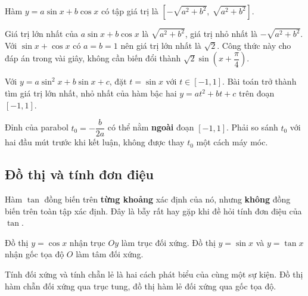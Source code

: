 \documentclass[11pt, a4paper]{article}
\begin{document}
\begin{dinhly}
Hàm $y = a\sin x + b\cos x$ có tập giá trị là $\left[-\sqrt{a^2 + b^2},\ \sqrt{a^2 + b^2}\right]$.

 Giá trị lớn nhất của $a\sin x + b\cos x$ là $\sqrt{a^2 + b^2}$, giá trị nhỏ nhất là $-\sqrt{a^2 + b^2}$. Với $\sin x + \cos x$ có $a = b = 1$ nên giá trị lớn nhất là $\sqrt{2}$. Công thức này cho đáp án trong vài giây, không cần biến đổi thành $\sqrt{2}\sin\left(x + \dfrac{\pi}{4}\right)$.
\end{dinhly}
\begin{dinhly}
Với $y = a\sin^2 x + b\sin x + c$, đặt $t = \sin x$ với $t \in [-1, 1]$. Bài toán trở thành tìm giá trị lớn nhất, nhỏ nhất của hàm bậc hai $y = at^2 + bt + c$ trên đoạn $[-1, 1]$.

 Đỉnh của parabol $t_0 = -\dfrac{b}{2a}$ có thể nằm \textbf{ngoài} đoạn $[-1, 1]$. Phải so sánh $t_0$ với hai đầu mút trước khi kết luận, không được thay $t_0$ một cách máy móc.
\end{dinhly}
\subsection{Đồ thị và tính đơn điệu}

\begin{dinhly}

 Hàm $\tan$ đồng biến trên \textbf{từng khoảng} xác định của nó, nhưng \textbf{không} đồng biến trên toàn tập xác định. Đây là bẫy rất hay gặp khi đề hỏi tính đơn điệu của $\tan$.
\end{dinhly}
\begin{dinhly}
Đồ thị $y = \cos x$ nhận trục $Oy$ làm trục đối xứng. Đồ thị $y = \sin x$ và $y = \tan x$ nhận gốc tọa độ $O$ làm tâm đối xứng.

 Tính đối xứng và tính chẵn lẻ là hai cách phát biểu của cùng một sự kiện. Đồ thị hàm chẵn đối xứng qua trục tung, đồ thị hàm lẻ đối xứng qua gốc tọa độ.
\end{dinhly}
\end{document}
